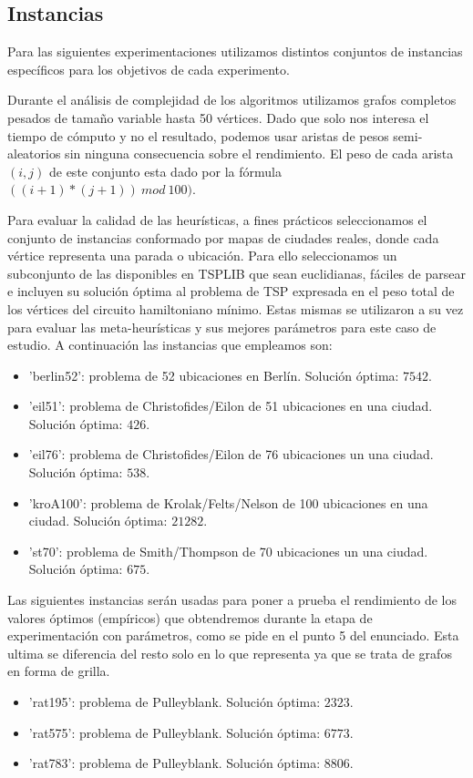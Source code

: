 \documentclass[10pt,a4paper]{article}
\begin{document}
\subsection{Instancias}\label{sec:exp-instancias}
Para las siguientes experimentaciones utilizamos distintos conjuntos de instancias específicos para los objetivos de cada experimento.

Durante el análisis de complejidad de los algoritmos utilizamos grafos completos pesados de tamaño variable hasta 50 vértices. Dado que solo nos interesa el tiempo de cómputo y no el resultado, podemos usar aristas de pesos semi-aleatorios sin ninguna consecuencia sobre el rendimiento. El peso de cada arista $(i, j)$ de este conjunto esta dado por la fórmula $((i+1)*(j+1))\ mod\ 100)$.

Para evaluar la calidad de las heurísticas, a fines prácticos seleccionamos el conjunto de instancias conformado por mapas de ciudades reales, donde cada vértice representa una parada o ubicación. Para ello seleccionamos un subconjunto de las disponibles en TSPLIB \cite{web:tsplib} que sean euclidianas, fáciles de parsear e incluyen su solución óptima al problema de TSP expresada en el peso total de los vértices del circuito hamiltoniano mínimo. Estas mismas se utilizaron a su vez para evaluar las meta-heurísticas y sus mejores parámetros para este caso de estudio. A continuación las instancias que empleamos son:
\begin{itemize}
    \item 'berlin52': problema de 52 ubicaciones en Berlín. Solución óptima: $7542$.
    \item 'eil51': problema de Christofides/Eilon de 51 ubicaciones en una ciudad. Solución óptima: $426$.
    \item 'eil76': problema de Christofides/Eilon de 76 ubicaciones un una ciudad. Solución óptima: $538$.
    \item 'kroA100': problema de Krolak/Felts/Nelson de 100 ubicaciones en una ciudad. Solución óptima: $21282$.
    \item 'st70': problema de Smith/Thompson de 70 ubicaciones un una ciudad. Solución óptima: $675$.
\end{itemize}

Las siguientes instancias serán usadas para poner a prueba el rendimiento de los valores óptimos (empíricos) que obtendremos durante la etapa de experimentación con parámetros, como se pide en el punto 5 del enunciado.
Esta ultima se diferencia del resto solo en lo que representa ya que se trata de grafos en forma de grilla.
\begin{itemize}
    \item 'rat195': problema de Pulleyblank. Solución óptima: $2323$.
    \item 'rat575': problema de Pulleyblank. Solución óptima: $6773$.
    \item 'rat783': problema de Pulleyblank. Solución óptima: $8806$.
\end{itemize}
\end{document}
